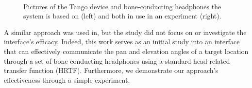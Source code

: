 \documentclass{llncs}
\begin{document}

\begin{figure}
  \centering
  ~
  \caption{Pictures of the Tango device and bone-conducting headphones the system is based on (left) and both in use in an experiment (right).}\label{fig:tango-headphone}
\end{figure}

A similar approach was used in\cite{durette2008visuo}, but the study did not focus on or investigate the interface's efficacy.
Indeed, this work serves as an initial study into an interface that can effectively communicate the pan and elevation angles of a target location through a set of bone-conducting headphones using a standard head-related transfer function (HRTF).
Furthermore, we demonstrate our approach's effectiveness through a simple experiment.
\end{document}
